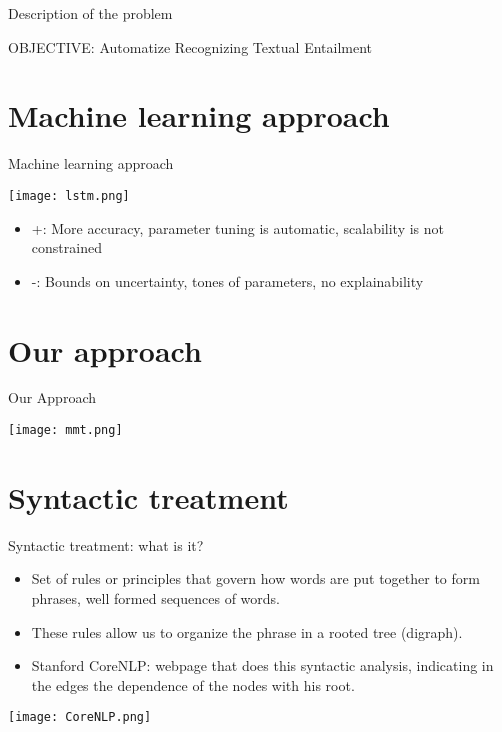 \documentclass{beamer}
\begin{document}
\begin{frame}{Description of the problem}
  \begin{center}
      OBJECTIVE:
  Automatize Recognizing Textual Entailment
\end{center}
\end{frame}


\section {Machine learning approach}
\begin{frame}{Machine learning approach}
  \begin{center}
  \texttt{[image: lstm.png]}
  \end{center}
  \begin{itemize}
  \item { +: More accuracy, parameter tuning is automatic, scalability is not constrained
  }
  \item { -: Bounds on uncertainty, tones of parameters, no explainability
  }
  \end{itemize}
\end{frame}


\section {Our approach}

\begin{frame}{ Our Approach}
  \begin{center}
  \texttt{[image: mmt.png]}
  \end{center}
\end{frame}

\section{Syntactic treatment}
\begin{frame}{Syntactic treatment: what is it?}
    \begin{itemize}
        \item Set of rules or principles that govern how words are put together to form phrases, well formed sequences of words. \break
        \item These rules allow us to organize the phrase in a rooted tree (digraph). \break
        \item Stanford CoreNLP: webpage that does this syntactic analysis, indicating in the edges the dependence of the nodes with his root.\break
    \end{itemize}
    \centering
    \texttt{[image: CoreNLP.png]}
\end{frame}
\end{document}
